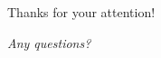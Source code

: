 \documentclass{beamer}
\begin{document}
\section{}
\begin{frame}
  \begin{center}
    \Huge{\alert{Thanks for your attention!}}\par
    \Huge{\textit{Any questions?}}
  \end{center}
  
\end{frame}
\end{document}
